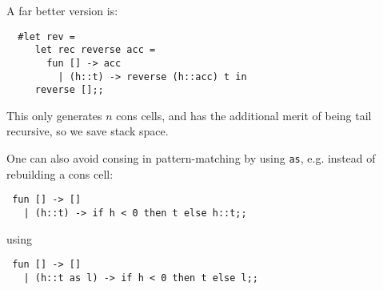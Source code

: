 \begin{slide*}


\vspace*{0.2cm}

A far better version is:

\begin{black}\begin{verbatim}
  #let rev =
     let rec reverse acc =
       fun [] -> acc
         | (h::t) -> reverse (h::acc) t in
     reverse [];;
\end{verbatim}\end{black}

This only generates {\red $n$} cons cells, and has the additional merit of
being tail recursive, so we save stack space.

One can also avoid consing in pattern-matching by using {\black \tt as}, e.g.
instead of rebuilding a cons cell:

\begin{black}\begin{verbatim}
 fun [] -> []
   | (h::t) -> if h < 0 then t else h::t;;
\end{verbatim}\end{black}

using

\begin{black}\begin{verbatim}
 fun [] -> []
   | (h::t as l) -> if h < 0 then t else l;;
\end{verbatim}\end{black}


\end{slide*}



